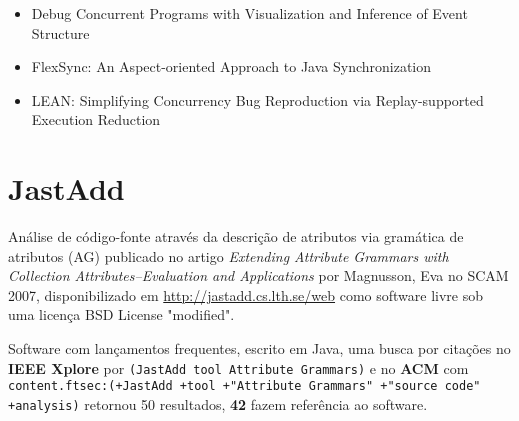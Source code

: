 \begin{itemize}
\item Debug Concurrent Programs with Visualization and Inference of Event Structure
\item FlexSync: An Aspect-oriented Approach to Java Synchronization
\item LEAN: Simplifying Concurrency Bug Reproduction via Replay-supported Execution Reduction
\end{itemize}


\section{JastAdd}

Análise de código-fonte através da descrição de atributos via gramática de atributos (AG)
publicado no artigo {\it Extending Attribute Grammars with Collection Attributes--Evaluation and Applications}
por Magnusson, Eva
no SCAM 2007,
disponibilizado em \url{http://jastadd.cs.lth.se/web}
como software livre
sob uma licença BSD License "modified".

Software com lançamentos frequentes,
escrito em Java,
uma busca por citações no {\bf IEEE Xplore} por
\texttt{(JastAdd tool Attribute Grammars)}
e no {\bf ACM} com
\texttt{content.ftsec:(+JastAdd +tool +"Attribute Grammars" +"source code" +analysis)}
retornou
50 resultados,
{\bf 42} fazem referência ao software.


